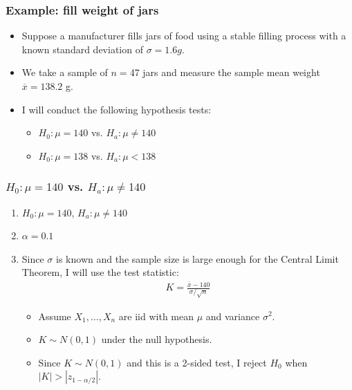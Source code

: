 \documentclass[handout]{beamer}\usepackage{graphicx, color}
\providecommand{\ov}[1]{\overline{#1}}
\numberwithin{equation}{section}
\begin{document}
\begin{frame}
\frametitle{Example: fill weight of jars} \small
\begin{itemize}
\pause \item Suppose a manufacturer fills jars of food using a stable filling process with a known standard deviation of $\sigma = 1.6 g$. 
\pause \item We take a sample of $n = $47 jars and measure the sample mean weight $\ov{x} = 138.2$ g.
\pause \item I will conduct the following hypothesis tests:
\begin{itemize}
\pause \item $H_0: \mu = 140$ vs. $H_a: \mu \ne 140$
\pause \item $H_0: \mu = 138$ vs. $H_a: \mu < 138$
\end{itemize}
\end{itemize}
\end{frame}

\begin{frame}
\frametitle{ $H_0: \mu = 140$ vs. $H_a: \mu \ne 140$} \small

\begin{enumerate}[1. ]
\item  $H_0: \mu = 140$, $H_a: \mu \ne 140$
\pause \item $\alpha = 0.1$
\pause \item Since $\sigma$ is known and the sample size is large enough for the Central Limit Theorem, I will use the test statistic:
\begin{align*}
K = \frac{\ov{x} - 140}{\sigma/\sqrt{n}}
\end{align*}
\begin{itemize}
\pause \item Assume $X_1, \ldots, X_n$ are iid with mean $\mu$ and variance $\sigma^2$.
\pause \item $K \sim N(0,1)$ under the null hypothesis.
\pause \item Since $K \sim N(0,1)$ and this is a 2-sided test, I reject $H_0$ when $|K| > |z_{1 - \alpha/2}|$.
\end{itemize}

\end{enumerate}
\end{frame}
\end{document}
